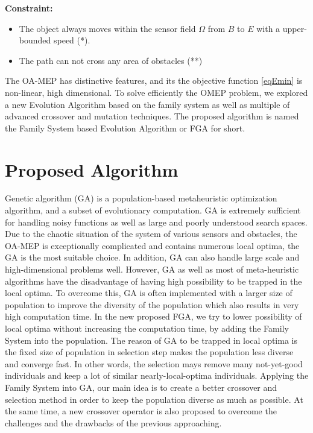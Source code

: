 \documentclass[final]{elsarticle}
\begin{document}
\textbf{Constraint:}	
\begin{itemize}
	\item The object always moves within the sensor field $\Omega $ from $B$ to $E$ with a upper-bounded speed (*).
	\item The path can not cross any area of obstacles  (**)
\end{itemize}
	
The OA-MEP has distinctive features, and its the objective function \eqref{eqEmin} is non-linear, high dimensional. To solve efficiently the OMEP problem, we explored a new Evolution Algorithm based on the family system as well as multiple of advanced crossover and mutation techniques. The proposed algorithm is named the Family System based Evolution Algorithm or FGA for short.

\section{Proposed Algorithm}

Genetic algorithm (GA) is a population-based metaheuristic optimization algorithm, and a subset of evolutionary computation. GA is extremely sufficient for handling noisy functions as well as large and poorly understood search spaces. Due to the chaotic situation of the system of various sensors and obstacles, the OA-MEP is exceptionally complicated and contains numerous local optima, the GA is the most suitable choice. In addition, GA can also handle large scale and high-dimensional problems well. However, GA as well as most of meta-heuristic algorithms have the disadvantage of having high possibility to be trapped in the local optima. To overcome this, GA is often implemented with a larger size of population to improve the diversity of the population which also results in very high computation time. In the new proposed FGA, we try to lower possibility of local optima without increasing the computation time, by adding the Family System into the population. The reason of GA to be trapped in local optima is the fixed size of population in selection step makes the population less diverse and converge fast. In other words, the selection mays remove many not-yet-good individuals and keep a lot of similar nearly-local-optima individuals. Applying the Family System into GA, our main idea is to create a better crossover and selection method in order to keep the population diverse as much as possible. At the same time, a new crossover operator is also proposed to overcome the challenges and the drawbacks of the previous approaching.
\end{document}
